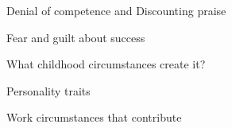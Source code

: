 \documentclass[aspectratio=169]{beamer}
\begin{document}
\begin{frame}
  \begin{center}
    \Huge Denial of competence and Discounting praise
    \\ \small \cite{sakulku11}
  \end{center}
\end{frame}

\begin{frame}
  \begin{center}
    \Huge Fear and guilt about success
    \\ \small \cite{sakulku11}
  \end{center}
\end{frame}


\begin{frame}
  \begin{center}
    \Huge What childhood circumstances create it?

    \small \cite{sakulku11}
  \end{center}
\end{frame}

\begin{frame}
  \begin{center}
    \Huge Personality traits
    \\ \small \cite{hh15}
  \end{center}
\end{frame}

\begin{frame}
  \begin{center}
    \Huge Work circumstances that contribute
    \\ \small \cite{hh15}
  \end{center}
\end{frame}
\end{document}
